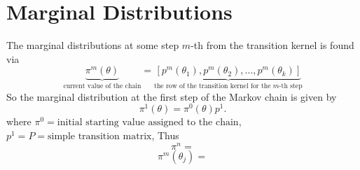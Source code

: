 \documentclass[lecture,12pt,]{pcms-l}
\numberwithin{section}{chapter}
\numberwithin{equation}{chapter}
\theoremstyle{plain}
\theoremstyle{definition}
\theoremstyle{definition}
\begin{document}
\section{Marginal Distributions}
The marginal distributions at some step $m$-th from the transition kernel is found via
\begin{equation}
\underbrace{\pi^{m}(\theta)}_{\text{current value of the chain}}=\underbrace{\left [  p^m(\theta_1),p^m(\theta_2),...,p^m(\theta_k) \right ]}_{\text{the row of the transition kernel for the $m$-th step}}
\end{equation} 
So the marginal distribution at the first step of the Markov chain is given by
\begin{equation}
\boxed{\pi^1(\theta)=\pi^0(\theta)p^1}.
\end{equation}
where $\pi^0=\text{initial starting value assigned to the chain}$, $p^1=P=\text{simple transition matrix}$, Thus
\begin{equation}
\pi^n=
\end{equation}
\begin{equation}
\pi^m(\theta_j)=
\end{equation}
\end{document}
